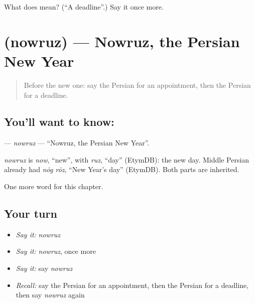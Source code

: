 \begin{tcolorbox}[breakable,colback=teal!4,colframe=teal!35!black,title={Before you move on}]
What does  mean? (\textquotedblleft{}A deadline\textquotedblright{}.) Say it once more.
\end{tcolorbox}
\section[\texorpdfstring{\fa{نوروز} (nowruz)}{نوروز (nowruz)}]{ (nowruz) — Nowruz, the Persian New Year}

\label{lesson:FA-C191-nowruz}



\begin{quote}
Before the new one: say the Persian for an appointment, then the Persian for a deadline.
\end{quote}

\subsection*{You'll want to know: }
\textbf{} — \emph{nowruz} — \textquotedblleft{}Nowruz, the Persian New Year\textquotedblright{}.

\begin{cousinweb}
\emph{nowruz} is \emph{now}, \textquotedblleft{}new\textquotedblright{}, with \emph{ruz}, \textquotedblleft{}day\textquotedblright{} (EtymDB): the new day. Middle Persian already had \emph{nōg rōz}, \textquotedblleft{}New Year's day\textquotedblright{} (EtymDB). Both parts are inherited.
\end{cousinweb}

\begin{grammarlens}[title={What you've built}]
One more word for this chapter.
\end{grammarlens}

\subsection*{Your turn}
\begin{itemize}
\raggedright
  \item \emph{Say it:} \emph{nowruz}
  \item \emph{Say it:} \emph{nowruz}, once more
  \item \emph{Say it:} say \emph{nowruz}
  \item \emph{Recall:} say the Persian for an appointment, then the Persian for a deadline, then say \emph{nowruz} again
\end{itemize}

